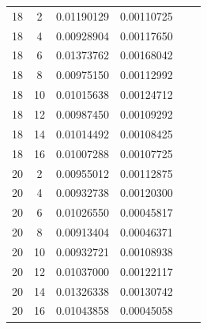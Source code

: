 \documentclass[letterpaper,12pt]{article}
\theoremstyle{remark}
\begin{document}
\begin{tabular}{cccccc}
18 & 2 & 0.01190129 & 0.00110725 \\
18 & 4 & 0.00928904 & 0.00117650 \\
18 & 6 & 0.01373762 & 0.00168042 \\
18 & 8 & 0.00975150 & 0.00112992 \\
18 & 10 & 0.01015638 & 0.00124712 \\
18 & 12 & 0.00987450 & 0.00109292 \\
18 & 14 & 0.01014492 & 0.00108425 \\
18 & 16 & 0.01007288 & 0.00107725 \\
20 & 2 & 0.00955012 & 0.00112875 \\
20 & 4 & 0.00932738 & 0.00120300 \\
20 & 6 & 0.01026550 & 0.00045817 \\
20 & 8 & 0.00913404 & 0.00046371 \\
20 & 10 & 0.00932721 & 0.00108938 \\
20 & 12 & 0.01037000 & 0.00122117 \\
20 & 14 & 0.01326338 & 0.00130742 \\
20 & 16 & 0.01043858 & 0.00045058 \\
\end{tabular}
\end{document}
